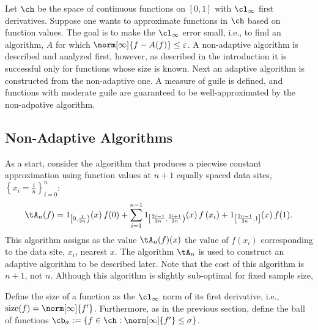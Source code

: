 \documentclass[12pt]{amsart}
\DeclareMathOperator{\size}{size}
\begin{document}
Let $\ch$ be the space of continuous functions on $[0,1]$ with $\cl_{\infty}$ first derivatives.  Suppose one wants to approximate functions in $\ch$ based on function values.  The goal is to make the $\cl_{\infty}$ error small, i.e., to find an algorithm, $A$ for which $\norm[\infty]{f - A(f)} \le \varepsilon$.  A non-adaptive algorithm is described and analyzed first, however, as described in the introduction it is successful only for functions whose size is known.  Next an adaptive algorithm is constructed from the non-adaptive one.  A measure of guile is defined, and functions with moderate guile are guaranteed to be well-approximated by the non-adpative algorithm.

\subsection{Non-Adaptive Algorithms} As a start, consider the algorithm that produces a piecwise constant approximation using function values at $n+1$ equally spaced data sites, $\left\{x_i = \frac{i}{n}\right\}_{i=0}^n$:
\begin{equation} \label{appxbuildblock}
\tA_n(f) = 1_{\left[0,\frac{1}{2n}\right)}(x) \, f(0) + \sum_{i=1}^{n-1} 1_{\left[\frac{2i-1}{2n},\frac{2i+1}{2n}\right)}(x) \, f\left(x_i\right) + 1_{\left[\frac{2n-1}{2n},1\right]}(x) \, f(1).
\end{equation}
This algorithm assigns as the value $\tA_n(f)(x)$ the value of $f\left(x_i\right)$ corresponding to the data site, $x_i$, nearest $x$.  The algorithm $\tA_n$ is used to construct an adaptive algorithm to be described later.  Note that the cost of this algorithm is $n+1$, not $n$.  Although this algorithm is slightly sub-optimal for fixed sample size, 

Define the size of a function as the $\cl_{\infty}$ norm of its first derivative, i.e., $\size(f) = \norm[\infty]{f'}$. Furthermore, as in the previous section, define the ball of functions $\cb_{\sigma} :=\{f \in \ch : \norm[\infty]{f'} \le \sigma\}$.
\end{document}
